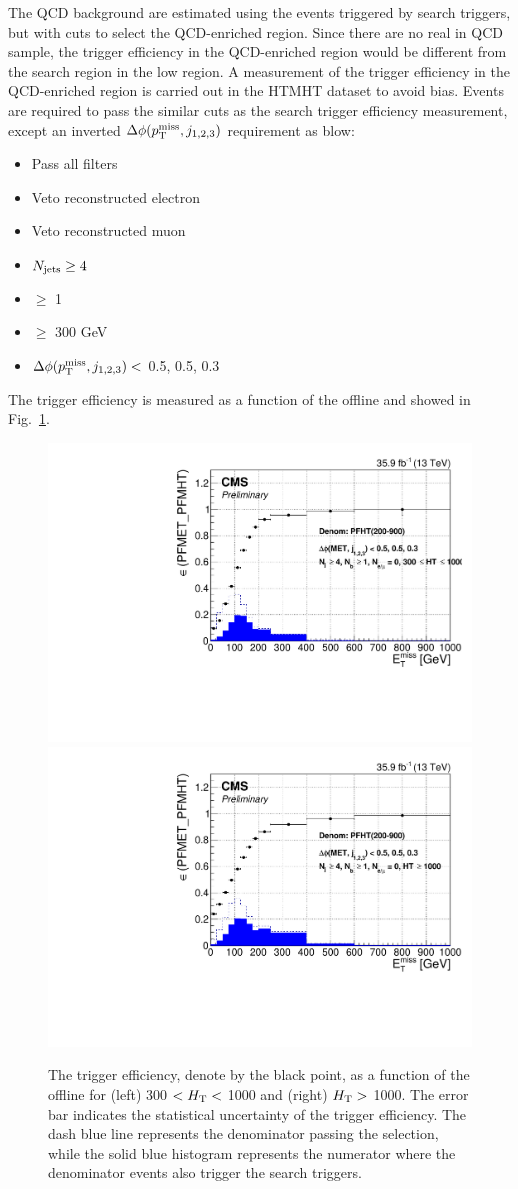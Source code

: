 The QCD background are estimated using the events triggered by search
triggers, but with cuts to select the QCD-enriched region. Since there are no
real \MET in QCD sample, the \MET trigger efficiency in the QCD-enriched
region would be different from the search region in the low \MET region. A
measurement of the trigger efficiency in the QCD-enriched region is carried
out in the HTMHT dataset to avoid bias. Events are required to pass the
similar cuts as the search trigger efficiency measurement, except an inverted
$\Delta\phi(p^{\rm miss}_{\rm T}, j_{1,2,3})$ requirement as blow:
\begin{itemize}
  \item Pass all filters
  \item Veto reconstructed electron
  \item Veto reconstructed muon
  \item $N_{\text{jets}}\geq4$
  \item \nbjets $\ge$ 1
  \item \HT $\ge$ 300 GeV
  \item $\Delta\phi(p^{\rm miss}_{\rm T}, j_{1,2,3})<$ 0.5, 0.5, 0.3
\end{itemize}
The trigger efficiency is measured as a function of the offline \MET and showed in Fig.~\ref{fig:TrigMETQCD}.
\begin{figure}[tbp]
 \begin{center}
   \includegraphics[width=0.49\linewidth]{sections/mc4/EvtSelSBOpt/figures/TrigHT_QCD_TrigMET_HTLess1000_9.pdf}
   \includegraphics[width=0.49\linewidth]{sections/mc4/EvtSelSBOpt/figures/TrigHT_QCD_TrigMET_HTMore1000_9.pdf}
   \caption{ The trigger efficiency, denote by the black point, as a function
   of the offline \MET for (left) 300 $< H_{\mathrm{T}} <$ 1000 and (right) $H_{\mathrm{T}} >$ 1000.
   The error bar indicates the statistical uncertainty of the trigger
   efficiency. The dash blue line represents the denominator passing the
   selection, while the solid blue histogram represents the numerator where
   the denominator events also trigger the search triggers. }
   \label{fig:TrigMETQCD}
 \end{center}
\end{figure}

